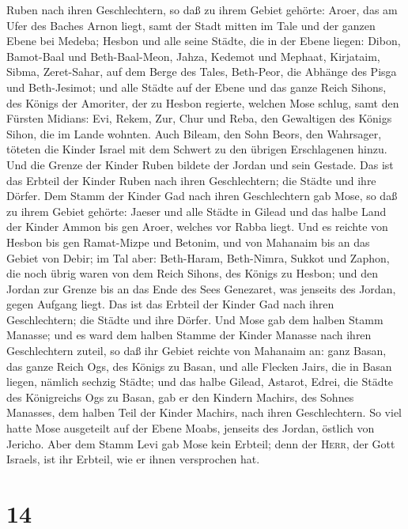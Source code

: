 Ruben nach ihren Geschlechtern,  so daß zu ihrem Gebiet
gehörte: Aroer, das am Ufer des Baches Arnon liegt, samt der Stadt
mitten im Tale und der ganzen Ebene bei Medeba;  Hesbon
und alle seine Städte, die in der Ebene liegen: Dibon, Bamot-Baal und
Beth-Baal-Meon,  Jahza, Kedemot und Mephaat,
 Kirjataim, Sibma, Zeret-Sahar, auf dem Berge des Tales,
 Beth-Peor, die Abhänge des Pisga und Beth-Jesimot;
 und alle Städte auf der Ebene und das ganze Reich
Sihons, des Königs der Amoriter, der zu Hesbon regierte, welchen Mose
schlug, samt den Fürsten Midians: Evi, Rekem, Zur, Chur und Reba, den
Gewaltigen des Königs Sihon, die im Lande wohnten.  Auch
Bileam, den Sohn Beors, den Wahrsager, töteten die Kinder Israel mit dem
Schwert zu den übrigen Erschlagenen hinzu.  Und die
Grenze der Kinder Ruben bildete der Jordan und sein Gestade. Das ist das
Erbteil der Kinder Ruben nach ihren Geschlechtern; die Städte und ihre
Dörfer.  Dem Stamm der Kinder Gad nach ihren
Geschlechtern gab Mose,  so daß zu ihrem Gebiet gehörte:
Jaeser und alle Städte in Gilead und das halbe Land der Kinder Ammon bis
gen Aroer, welches vor Rabba liegt.  Und es reichte von
Hesbon bis gen Ramat-Mizpe und Betonim, und von Mahanaim bis an das
Gebiet von Debir;  im Tal aber: Beth-Haram, Beth-Nimra,
Sukkot und Zaphon, die noch übrig waren von dem Reich Sihons, des Königs
zu Hesbon; und den Jordan zur Grenze bis an das Ende des Sees Genezaret,
was jenseits des Jordan, gegen Aufgang liegt.  Das ist
das Erbteil der Kinder Gad nach ihren Geschlechtern; die Städte und ihre
Dörfer.  Und Mose gab dem halben Stamm Manasse; und es
ward dem halben Stamme der Kinder Manasse nach ihren Geschlechtern
zuteil,  so daß ihr Gebiet reichte von Mahanaim an: ganz
Basan, das ganze Reich Ogs, des Königs zu Basan, und alle Flecken Jairs,
die in Basan liegen, nämlich sechzig Städte;  und das
halbe Gilead, Astarot, Edrei, die Städte des Königreichs Ogs zu Basan,
gab er den Kindern Machirs, des Sohnes Manasses, dem halben Teil der
Kinder Machirs, nach ihren Geschlechtern.  So viel hatte
Mose ausgeteilt auf der Ebene Moabs, jenseits des Jordan, östlich von
Jericho.  Aber dem Stamm Levi gab Mose kein Erbteil; denn
der \textsc{Herr}, der Gott Israels, ist ihr Erbteil, wie er ihnen
versprochen hat.

\hypertarget{section-13}{%
\section{14}\label{section-13}}


